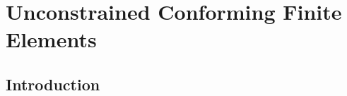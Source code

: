 \section{Unconstrained Conforming Finite Elements}\label{Sec:EllipticProblems}
\subsection{Introduction}


